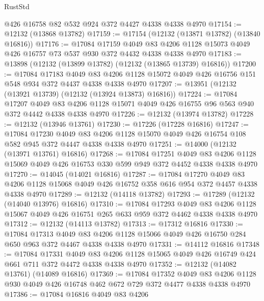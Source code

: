 \begin{lexlean}{RustStd}
\begin{coremodule}
    @426
    @16758
    @82
    @532
    @924
    @372
    @4427
    @4338
    @4338
    @4970
@17154 := @12132 (@13868 @13782)
@17159 := @17154 (@12132 (@13871 @13782) (@13840 @16816))
@17176 := @17084
    @17159
    @4049
    @83
    @4206
    @1128
    @15073
    @4049
    @426
    @16757
    @73
    @537
    @930
    @372
    @4432
    @4338
    @4338
    @4970
@17183 := @13898 (@12132 (@13899 @13782) (@12132 (@13865 @13739) @16816))
@17200 := @17084
    @17183
    @4049
    @83
    @4206
    @1128
    @15072
    @4049
    @426
    @16756
    @151
    @548
    @934
    @372
    @4437
    @4338
    @4338
    @4970
@17207 := @13951 (@12132 (@13921 @13739) (@12132 (@13924 @13873) @16816))
@17224 := @17084
    @17207
    @4049
    @83
    @4206
    @1128
    @15071
    @4049
    @426
    @16755
    @96
    @563
    @940
    @372
    @4442
    @4338
    @4338
    @4970
@17226 := @12132 (@13974 @13782)
@17228 := @12132 (@13946 @13761)
@17230 := @17226 (@17228 @16816)
@17247 := @17084
    @17230
    @4049
    @83
    @4206
    @1128
    @15070
    @4049
    @426
    @16754
    @108
    @582
    @945
    @372
    @4447
    @4338
    @4338
    @4970
@17251 := @14000 (@12132 (@13971 @13761) @16816)
@17268 := @17084
    @17251
    @4049
    @83
    @4206
    @1128
    @15069
    @4049
    @426
    @16753
    @330
    @599
    @949
    @372
    @4452
    @4338
    @4338
    @4970
@17270 := @14045 (@14021 @16816)
@17287 := @17084
    @17270
    @4049
    @83
    @4206
    @1128
    @15068
    @4049
    @426
    @16752
    @358
    @616
    @954
    @372
    @4457
    @4338
    @4338
    @4970
@17289 := @12132 (@14118 @13782)
@17293 := @17289 (@12132 (@14040 @13976) @16816)
@17310 := @17084
    @17293
    @4049
    @83
    @4206
    @1128
    @15067
    @4049
    @426
    @16751
    @265
    @633
    @959
    @372
    @4462
    @4338
    @4338
    @4970
@17312 := @12132 (@14113 @13782)
@17313 := @17312 @16816
@17330 := @17084
    @17313
    @4049
    @83
    @4206
    @1128
    @15066
    @4049
    @426
    @16750
    @284
    @650
    @963
    @372
    @4467
    @4338
    @4338
    @4970
@17331 := @14112 @16816
@17348 := @17084
    @17331
    @4049
    @83
    @4206
    @1128
    @15065
    @4049
    @426
    @16749
    @424
    @661
    @711
    @372
    @4472
    @4338
    @4338
    @4970
@17352 := @12132 (@14082 @13761) (@14089 @16816)
@17369 := @17084
    @17352
    @4049
    @83
    @4206
    @1128
    @930
    @4049
    @426
    @16748
    @462
    @672
    @729
    @372
    @4477
    @4338
    @4338
    @4970
@17386 := @17084
    @16816
    @4049
    @83
    @4206

\end{coremodule}
\end{lexlean}
